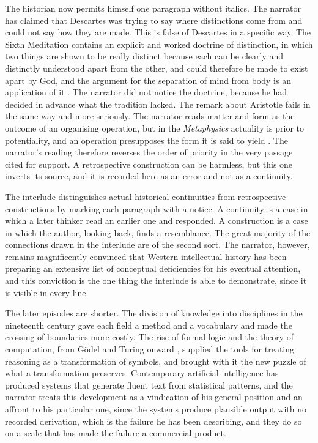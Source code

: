 \documentclass[11pt,openany,twoside]{book}
\theoremstyle{plain}
\theoremstyle{definition}
\theoremstyle{remark}
\begin{document}
The historian now permits himself one paragraph without italics. The narrator has claimed that Descartes was trying to say where distinctions come from and could not say how they are made. This is false of Descartes in a specific way. The Sixth Meditation contains an explicit and worked doctrine of distinction, in which two things are shown to be really distinct because each can be clearly and distinctly understood apart from the other, and could therefore be made to exist apart by God, and the argument for the separation of mind from body is an application of it \cite{descartes-meditations}. The narrator did not notice the doctrine, because he had decided in advance what the tradition lacked. The remark about Aristotle fails in the same way and more seriously. The narrator reads matter and form as the outcome of an organising operation, but in the \emph{Metaphysics} actuality is prior to potentiality, and an operation presupposes the form it is said to yield \cite{aristotle-metaphysics}. The narrator's reading therefore reverses the order of priority in the very passage cited for support. A retrospective construction can be harmless, but this one inverts its source, and it is recorded here as an error and not as a continuity.

The interlude distinguishes actual historical continuities from retrospective constructions by marking each paragraph with a notice. A continuity is a case in which a later thinker read an earlier one and responded. A construction is a case in which the author, looking back, finds a resemblance. The great majority of the connections drawn in the interlude are of the second sort. The narrator, however, remains magnificently convinced that Western intellectual history has been preparing an extensive list of conceptual deficiencies for his eventual attention, and this conviction is the one thing the interlude is able to demonstrate, since it is visible in every line.

The later episodes are shorter. The division of knowledge into disciplines in the nineteenth century gave each field a method and a vocabulary and made the crossing of boundaries more costly. The rise of formal logic and the theory of computation, from Gödel and Turing onward \cite{turing-1936}, supplied the tools for treating reasoning as a transformation of symbols, and brought with it the new puzzle of what a transformation preserves. Contemporary artificial intelligence has produced systems that generate fluent text from statistical patterns, and the narrator treats this development as a vindication of his general position and an affront to his particular one, since the systems produce plausible output with no recorded derivation, which is the failure he has been describing, and they do so on a scale that has made the failure a commercial product.
\end{document}
